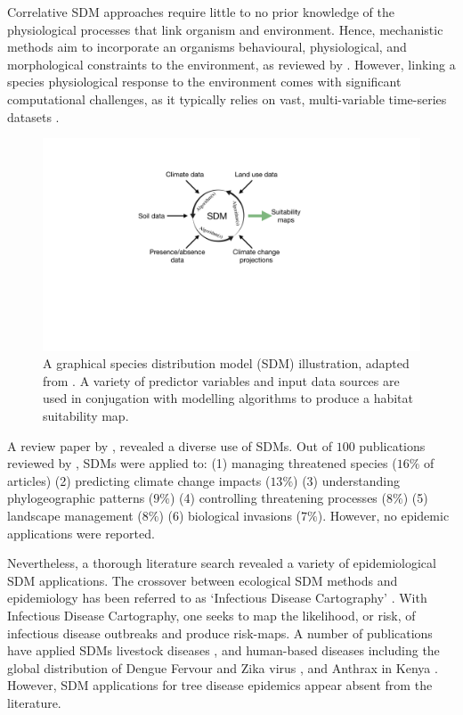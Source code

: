 Correlative SDM approaches require little to no prior knowledge of the physiological processes that link organism and environment.
Hence, mechanistic methods aim to incorporate an organisms behavioural, physiological, and morphological constraints to the environment, 
as reviewed by \cite{kearney2009mechanistic}. However, linking a species physiological response to the environment comes with significant
computational challenges, as it typically relies on vast, multi-variable time-series datasets \cite{shabani2016comparison}.

\begin{figure}
    \centering
    \includegraphics[scale=0.35]{chapter2/figures/SDM-fig.pdf}
    \caption{A graphical species distribution model (SDM) illustration, adapted from \cite{SDM_1}. 
             A variety of predictor variables and input data sources are used in conjugation with modelling algorithms to produce
             a habitat suitability map.}
    \label{fig:sdm}
\end{figure}

A review paper by \cite{guillera2015my}, revealed a diverse use of SDMs.
Out of $100$ publications reviewed by \cite{guillera2015my}, SDMs were applied to: 
(1) managing threatened species ($16\% $ of articles) 
(2) predicting climate change impacts ($13\%$) 
(3) understanding phylogeographic patterns ($9\%$) 
(4) controlling threatening processes ($8\%$) 
(5) landscape management ($8\%$) 
(6) biological invasions ($7\%$). However, no epidemic applications were reported.

Nevertheless, a thorough literature search revealed a variety of epidemiological SDM applications.
The crossover between ecological SDM methods and epidemiology has been referred to as `Infectious Disease Cartography' \cite{KRAEMER201619}.
With Infectious Disease Cartography, one seeks to map the likelihood, or risk, of infectious disease outbreaks and produce risk-maps.
A number of publications have applied SDMs livestock diseases \cite{hollings2017species}, and human-based diseases including the global 
distribution of Dengue Fervour \cite{bhatt2013global} and Zika virus \cite{messina2016mapping}, and Anthrax in Kenya \cite{otieno2021modeling}.
However, SDM applications for tree disease epidemics appear absent from the literature.

